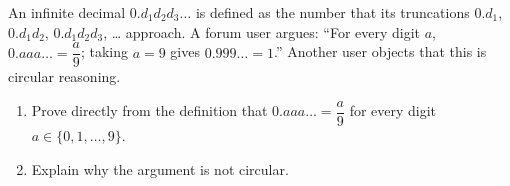 An infinite decimal $0.d_1d_2d_3\ldots$ is defined as the number that its truncations $0.d_1$, $0.d_1d_2$, $0.d_1d_2d_3$, \ldots{} approach. A forum user argues: ``For every digit $a$, $0.aaa\ldots=\dfrac {a}{9}$; taking $a=9$ gives $0.999\ldots=1$.'' Another user objects that this is circular reasoning.
\begin{enumerate}
\item[(a)] Prove directly from the definition that $0.aaa\ldots=\dfrac{a}{9}$ for every digit $a\in\{0,1,\ldots,9\}$.
\item[(b)] Explain why the argument is not circular.
\end{enumerate}

